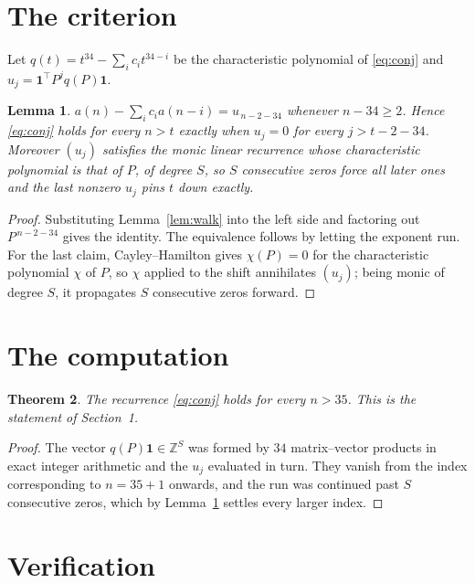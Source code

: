 \documentclass[11pt,a4paper]{article}
\theoremstyle{plain}
\newtheorem{theorem}{Theorem}
\newtheorem{lemma}[theorem]{Lemma}
\theoremstyle{definition}
\begin{document}
\section{The criterion}

Let $q(t)=t^{34}-\sum_i c_i t^{34-i}$ be the characteristic polynomial of
\eqref{eq:conj} and $u_j=\mathbf{1}^{\!\top}P^{j}q(P)\mathbf{1}$.

\begin{lemma}\label{lem:crit}
$a(n)-\sum_i c_i a(n-i)=u_{\,n-2-34}$ whenever $n-34\ge2$. Hence
\eqref{eq:conj} holds for every $n>t$ exactly when $u_j=0$ for every
$j>t-2-34$. Moreover $(u_j)$ satisfies the monic linear recurrence whose
characteristic polynomial is that of $P$, of degree $S$, so $S$ consecutive zeros force all
later ones and the last nonzero $u_j$ pins $t$ down exactly.
\end{lemma}

\begin{proof}
Substituting Lemma~\ref{lem:walk} into the left side and factoring out
$P^{\,n-2-34}$ gives the identity. The equivalence follows by letting the exponent
run. For the last claim, Cayley--Hamilton gives $\chi(P)=0$ for the characteristic
polynomial $\chi$ of $P$, so $\chi$ applied to the shift annihilates $(u_j)$; being monic of
degree $S$, it propagates $S$ consecutive zeros forward.
\end{proof}

\section{The computation}

\begin{theorem}
The recurrence \eqref{eq:conj} holds for every $n>35$. This is the statement of
Section~1.
\end{theorem}

\begin{proof}
The vector $q(P)\mathbf{1}\in\mathbb{Z}^{S}$ was formed by $34$ matrix--vector
products in exact integer arithmetic and the $u_j$ evaluated in turn. They vanish from the
index corresponding to $n=35+1$ onwards, and the run was continued past $S$ consecutive
zeros, which by Lemma~\ref{lem:crit} settles every larger index.
\end{proof}

\section{Verification}
\end{document}
